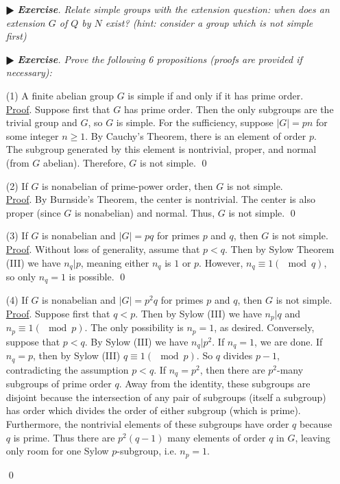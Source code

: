 \documentclass[11pt]{amsart}
\theoremstyle{definition}
\renewenvironment{proof}{\underline{Proof}.}{\qed}
\renewcommand\geq{\geqslant}
\renewcommand\:{\colon}
\newcommand{\1}{\mathds{1}}
\newcommand{\exc}[1]{\vspace{-2.5pt}\begin{itemize}[leftmargin=15pt]\item[$\RHD$] \textit{\textbf{Exercise}. #1}\end{itemize}}
\begin{document}
\exc{Relate simple groups with the extension question: when does an extension $G$ of $Q$ by $N$ exist? (hint: consider a group which is not simple first)}

\clearpage

\exc{Prove the following 6 propositions (proofs are provided if necessary):}
\vskip5pt

\begin{enumerate}[leftmargin=*]\setlength\itemsep{5pt}
\item[(1)] A finite abelian group $G$ is simple if and only if it has prime order. \\
\begin{proof}
	Suppose first that $G$ has prime order. Then the only subgroups are the trivial group and $G$, so $G$ is simple. For the sufficiency, suppose $|G| = pn$ for some integer $n \geq 1$. By Cauchy's Theorem, there is an element of order $p$. The subgroup generated by this element is nontrivial, proper, and normal (from $G$ abelian). Therefore, $G$ is not simple.
\end{proof}
\item[(2)] If $G $ is nonabelian of prime-power order, then $G$ is not simple. \\
\begin{proof}
	By Burnside's Theorem, the center is nontrivial. The center is also proper (since $G$ is nonabelian) and normal. Thus, $G$ is not simple.
\end{proof}
\item[(3)] If $G$ is nonabelian and $|G| = pq$ for primes $p$ and $q$, then $G$ is not simple. \\
\begin{proof}
	Without loss of generality, assume that $p < q$. Then by Sylow Theorem (III) we have $n_q|p$, meaning either $n_q$ is $1$ or $p$. However, $n_q \equiv 1 (\mod q)$, so only $n_q = 1$ is possible.
\end{proof}
\item[(4)] If $G$ is nonabelian and $|G| = p^2q$ for primes $p$ and $q$, then $G$ is not simple. \\
\begin{proof}
	Suppose first that $q < p$. Then by Sylow (III) we have $n_p|q$ and $n_p \equiv 1 (\mod p)$. The only possibility is $n_p = 1$, as desired.  Conversely, suppose that $p < q$. By Sylow (III) we have $n_q|p^2$. If $n_q = 1$, we are done. If $n_q = p$, then by Sylow (III) $q \equiv 1 (\mod p)$. So $q$ divides $p-1$, contradicting the assumption $p < q$. If $n_q = p^2$, then there are $p^2$-many subgroups of prime order $q$. Away from the identity, these subgroups are disjoint because the intersection of any pair of subgroups (itself a subgroup) has order which divides the order of either subgroup (which is prime). Furthermore, the nontrivial elements of these subgroups have order $q$ because $q$ is prime. Thus there are $p^2(q - 1)$ many elements of order $q$ in $G$, leaving only room for one Sylow $p$-subgroup, i.e. $n_p = 1$.

\end{proof}
\end{enumerate}
\end{document}
